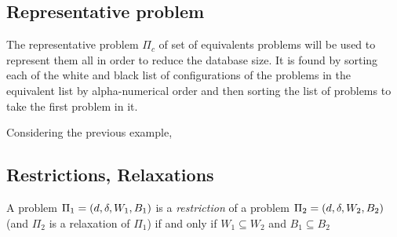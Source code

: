 \subsection{Representative problem}
The representative problem $\Pi_c$ of set of equivalents problems will be used to represent them all in order to reduce the database size. It is found by sorting each of the white and black list of configurations of the problems in the equivalent list by alpha-numerical order and then sorting the list of problems to take the first problem in it.
\begin{exmp}
Considering the previous example,
\end{exmp}
\subsection{Restrictions, Relaxations}
A problem $\Pi_1 = (d,\delta,W_1,B_1)$ is a \textit{restriction} of a problem $\Pi_2 = (d,\delta,W_2,B_2)$ (and $\Pi_2$ is a relaxation of $\Pi_1$) if and only if $W_1\subseteq W_2$ and $B_1\subseteq B_2$